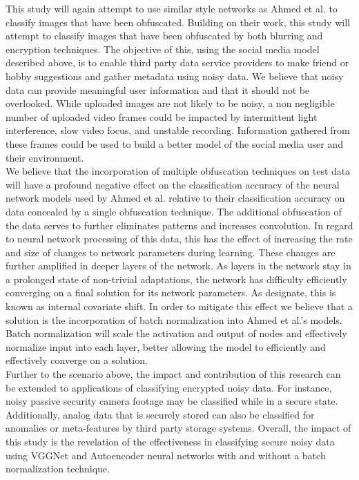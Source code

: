 \documentclass[12pt, titlepage]{article}
\begin{document}
\noindent This study will again attempt to use similar style networks as Ahmed et al. to classify images that have been obfuscated. Building on their work, this study will attempt to classify images that have been obfuscated by both blurring and encryption techniques. The objective of this, using the social media model described above, is to enable third party data service providers to make friend or hobby suggestions and gather metadata using noisy data. We believe that noisy data can provide meaningful user information and that it should not be overlooked. While uploaded images are not likely to be noisy, a non negligible number of uploaded video frames could be impacted by intermittent light interference, slow video focus, and unstable recording. Information gathered from these frames could be used to build a better model of the social media user and their environment.\\ 

\noindent We believe that the incorporation of multiple obfuscation techniques on test data will have a profound negative effect on the classification accuracy of the neural network models used by Ahmed et al. relative to their classification accuracy on data concealed by a single obfuscation technique. The additional obfuscation of the data serves to further eliminates patterns and increases convolution. In regard to neural network processing of this data, this has the effect of increasing the rate and size of changes to network parameters during learning. These changes are further amplified in deeper layers of the network. As layers in the network stay in a prolonged state of non-trivial adaptations, the network has difficulty efficiently converging on a final solution for its network parameters. As \cite{ioffe2015batch} designate, this is known as internal covariate shift. In order to mitigate this effect we believe that a solution is the incorporation of batch normalization into Ahmed et al.'s models. Batch normalization will scale the activation and output of nodes and effectively normalize input into each layer, better allowing the model to efficiently and effectively converge on a solution.\\

\noindent Further to the scenario above, the impact and contribution of this research  can be extended to applications of classifying encrypted noisy data. For instance, noisy passive security camera footage may be classified while in a secure state. Additionally, analog data that is securely stored can also be classified for anomalies or meta-features by third party storage systems. Overall, the impact of this study is the revelation of the effectiveness in classifying secure noisy data using VGGNet and Autoencoder neural networks with and without a batch normalization technique.\\
\end{document}
